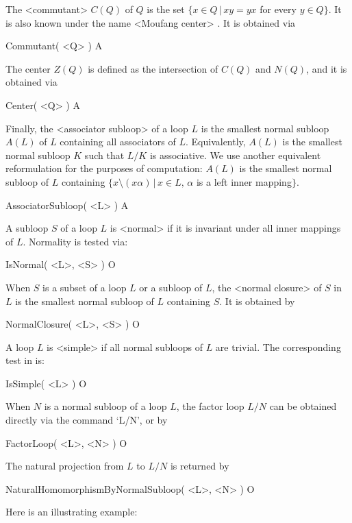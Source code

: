 The <commutant>
%
%
 $C(Q)$ of $Q$ is the set $\{x\in Q\,|\,xy=yx$
for every $y\in Q\}$. It is also known under the name <Moufang center>
%
%
.
It is obtained via

\>Commutant( <Q> ) A

The center $Z(Q)$ is defined as the intersection of $C(Q)$ and $N(Q)$, and it
is obtained via

\>Center( <Q> ) A

Finally, the <associator subloop>
%
%
of a loop $L$ is the smallest normal subloop $A(L)$ of $L$
containing all associators of $L$. Equivalently, $A(L)$ is the
smallest normal subloop $K$ such that $L/K$ is associative. We use
another equivalent reformulation for the purposes of computation:
$A(L)$ is the smallest normal subloop of $L$ containing
$\{x\setminus(x\alpha)\,|\,x\in L,\,\alpha$ is a left inner
mapping$\}$.

\>AssociatorSubloop( <L> )  A


A subloop $S$ of a loop $L$ is <normal> if it is
invariant under all inner mappings of $L$. Normality is tested via:

\>IsNormal( <L>, <S> ) O

When $S$ is a subset of a loop $L$ or a subloop of $L$, the <normal closure>
%
%
 of $S$ in $L$ is the smallest normal subloop of $L$ containing $S$. It
is obtained by

\>NormalClosure( <L>, <S> ) O

A loop $L$ is <simple> if all normal subloops of $L$ are
trivial. The corresponding test in {\LOOPS} is:

\>IsSimple( <L> ) O


When $N$ is a normal subloop of a loop $L$, the factor loop $L/N$ can be
obtained directly via the command `L/N', or by

\>FactorLoop( <L>, <N> ) O

The natural projection from $L$ to $L/N$ is returned by

\>NaturalHomomorphismByNormalSubloop( <L>, <N> ) O

Here is an illustrating example:

